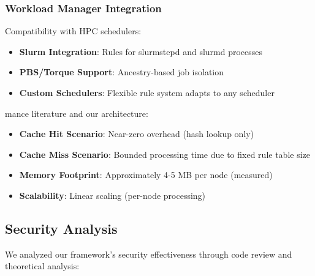 \documentclass[conference]{IEEEtran}
\begin{document}
\subsubsection{Workload Manager Integration}
Compatibility with HPC schedulers:
\begin{itemize}
\item \textbf{Slurm Integration}: Rules for slurmstepd and slurmd processes
\item \textbf{PBS/Torque Support}: Ancestry-based job isolation
\item \textbf{Custom Schedulers}: Flexible rule system adapts to any scheduler
\end{itemize}mance literature \cite{hoiland2018express} and our architecture:
\begin{itemize}
\item \textbf{Cache Hit Scenario}: Near-zero overhead (hash lookup only)
\item \textbf{Cache Miss Scenario}: Bounded processing time due to fixed rule table size
\item \textbf{Memory Footprint}: Approximately 4-5 MB per node (measured)
\item \textbf{Scalability}: Linear scaling (per-node processing)
\end{itemize}

\subsection{Security Analysis}
We analyzed our framework's security effectiveness through code review and theoretical analysis:
\end{document}
